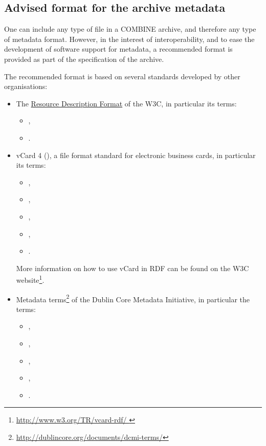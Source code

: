 \subsection{Advised format for the archive metadata}

One can include any type of file in a COMBINE archive, and therefore any 
type of metadata format. However, in the interest of interoperability, 
and to ease the development of software support for metadata, a 
recommended format is provided as part of the specification of the 
archive. 

The recommended format is based on several standards developed by other 
organisations: 

\begin{itemize}
	\item  {
	
     The \href{http://www.w3.org/RDF/ }{ Resource Description Format} of the 
     W3C, in particular its terms:
     \begin{itemize}
		\item {}, 
		\item {}.
	\end{itemize}
	}
	\item  {

	vCard 4 (\cite{rfc6350}), a file format standard for electronic business 
    cards, in particular its terms:
    	\begin{itemize}
		\item {}, 
		\item {}, 
		\item {}, 
		\item {},
		\item {}.
	\end{itemize}

	More information on how to use vCard in RDF can be found 
    on the W3C website\footnote[1]{\url{http://www.w3.org/TR/vcard-rdf/ }}.
	
	}
	\item {
	
	Metadata terms\footnote[2]{\url{http://dublincore.org/documents/dcmi-terms/}} of 
	the Dublin Core Metadata Initiative, in particular the terms: 

	\begin{itemize}
		\item {}, 
		\item {}, 
		\item {}, 
		\item {},
		\item {}.
	\end{itemize}
		
}
\end{itemize}
